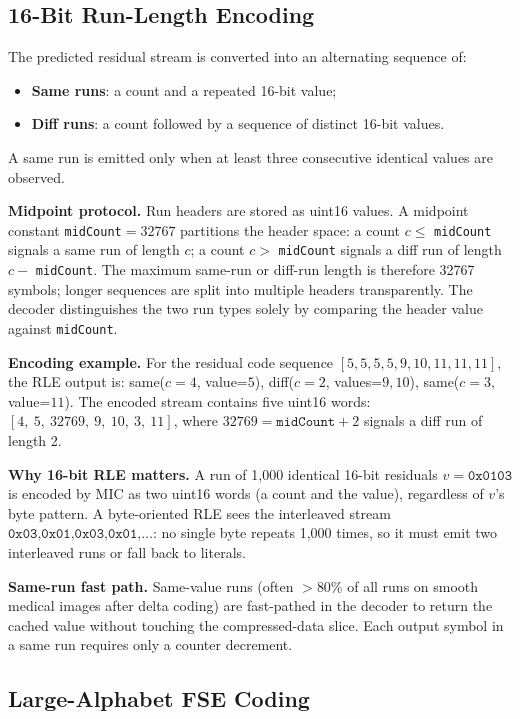 \documentclass[journal]{IEEEtran}
\begin{document}
\subsection{16-Bit Run-Length Encoding}

The predicted residual stream is converted into an alternating sequence of:
\begin{itemize}
  \item \textbf{Same runs}: a count and a repeated 16-bit value;
  \item \textbf{Diff runs}: a count followed by a sequence of distinct 16-bit
  values.
\end{itemize}

A same run is emitted only when at least three consecutive identical values are
observed.

\textbf{Midpoint protocol.} Run headers are stored as uint16 values. A
midpoint constant \texttt{midCount}$= 32767$ partitions the header space: a
count $c \leq$ \texttt{midCount} signals a same run of length $c$; a count
$c >$ \texttt{midCount} signals a diff run of length $c -$ \texttt{midCount}.
The maximum same-run or diff-run length is therefore 32767 symbols; longer
sequences are split into multiple headers transparently. The decoder
distinguishes the two run types solely by comparing the header value against
\texttt{midCount}.

\textbf{Encoding example.} For the residual code sequence
$[5,5,5,5,9,10,11,11,11]$, the RLE output is:
same($c=4$, value=$5$), diff($c=2$, values=$9,10$), same($c=3$, value=$11$).
The encoded stream contains five uint16 words: $[4,\ 5,\ 32769,\ 9,\ 10,\ 3,\ 11]$,
where $32769 = \texttt{midCount} + 2$ signals a diff run of length 2.

\textbf{Why 16-bit RLE matters.} A run of 1,000 identical 16-bit residuals
$v = \texttt{0x0103}$ is encoded by MIC as two uint16 words (a count and the
value), regardless of $v$'s byte pattern. A byte-oriented RLE sees the
interleaved stream $\texttt{0x03,0x01,0x03,0x01,\ldots}$: no single byte
repeats 1,000 times, so it must emit two interleaved runs or fall back to
literals.

\textbf{Same-run fast path.} Same-value runs (often $>$80\% of all runs on
smooth medical images after delta coding) are fast-pathed in the decoder to
return the cached value without touching the compressed-data slice. Each output
symbol in a same run requires only a counter decrement.

\subsection{Large-Alphabet FSE Coding}
\end{document}
